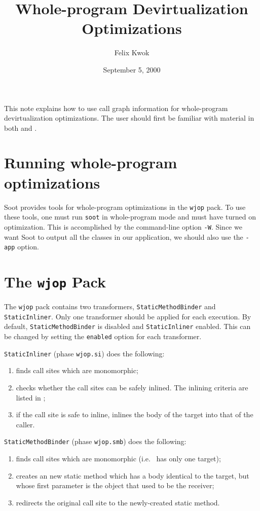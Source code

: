 \documentclass{article}
\title{Whole-program Devirtualization Optimizations}
\author{Felix Kwok \htmladdnormallink{(wkwok@sable.mcgill.ca)}{mailto:wkwok@sable.mcgill.ca}}
\date{September 5, 2000}
\begin{document}
\maketitle

This note explains how to use call graph information for whole-program devirtualization optimizations.
The user should first be familiar with material in both 
 and
.

\section{Running whole-program optimizations}

Soot provides tools for whole-program optimizations in the {\tt wjop} pack.
To use these tools, one must run {\tt soot} in whole-program mode and must have turned on optimization. This is
accomplished by the command-line option {\tt -W}. Since we want Soot to output
all the classes in our application, we should also use the {\tt -app} option.

\section{The {\tt wjop} Pack}
The {\tt wjop} pack contains two transformers, {\tt StaticMethodBinder} and {\tt StaticInliner}.
Only one transformer should be applied for each execution. By default, {\tt StaticMethodBinder}
is disabled and {\tt StaticInliner} enabled. This can be changed by setting the {\tt enabled}
option for each transformer.

\par 

{\tt StaticInliner} (phase {\tt wjop.si}) does the following:
\begin{enumerate}
\item finds call sites which are monomorphic;
\item checks whether the call sites can be safely inlined. The inlining criteria are listed in
;
\item if the call site is safe to inline, inlines the body of the target into that of the caller.
\end{enumerate}

\par

{\tt StaticMethodBinder} (phase {\tt wjop.smb}) does the following: 
\begin{enumerate}
\item finds call sites which are monomorphic (i.e.~ has only one target);
\item creates an new static method which has a body identical to the target, but whose first 
parameter is the object that used to be the receiver;
\item redirects the original call site to the newly-created static method.
\end{enumerate}
\end{document}
